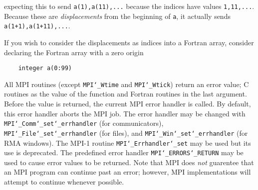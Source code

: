 expecting this to send {\tt a(1),a(11),...} because the indices have values
{\tt 1,11,...}.   Because these are {\em displacements} from the beginning of {\tt a},
it actually sends {\tt a(1+1),a(1+11),...}.
\par
If you wish to consider the displacements as indices into a Fortran array,
consider declaring the Fortran array with a zero origin
\begin{verbatim}
    integer a(0:99)
\end{verbatim}

\par
{}
\par
All MPI routines (except {\tt MPI{\tt \char`\_}Wtime} and {\tt MPI{\tt \char`\_}Wtick}) return an error value;
C routines as the value of the function and Fortran routines in the last
argument.  Before the value is returned, the current MPI error handler is
called.  By default, this error handler aborts the MPI job.  The error handler
may be changed with {\tt MPI{\tt \char`\_}Comm{\tt \char`\_}set{\tt \char`\_}errhandler} (for communicators),
{\tt MPI{\tt \char`\_}File{\tt \char`\_}set{\tt \char`\_}errhandler} (for files), and {\tt MPI{\tt \char`\_}Win{\tt \char`\_}set{\tt \char`\_}errhandler} (for
RMA windows).  The MPI-1 routine {\tt MPI{\tt \char`\_}Errhandler{\tt \char`\_}set} may be used but
its use is deprecated.  The predefined error handler
{\tt MPI{\tt \char`\_}ERRORS{\tt \char`\_}RETURN} may be used to cause error values to be returned.
Note that MPI does {\em not} guarentee that an MPI program can continue past
an error; however, MPI implementations will attempt to continue whenever
possible.
\par
{}
\endmanpage
